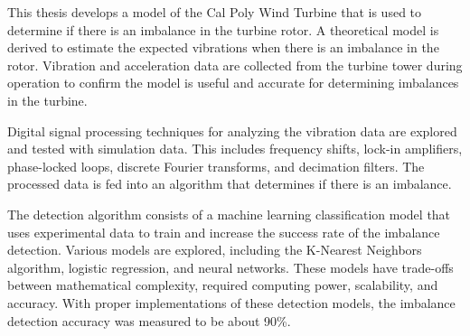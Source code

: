This thesis develops a model of the Cal Poly Wind Turbine that is used to determine if there is an imbalance in the turbine rotor.  A theoretical model is derived to estimate the expected vibrations when there is an imbalance in the rotor.  Vibration and acceleration data are collected from the turbine tower during operation to confirm the model is useful and accurate for determining imbalances in the turbine.  

Digital signal processing techniques for analyzing the vibration data are explored and tested with simulation data.  This includes frequency shifts, lock-in amplifiers, phase-locked loops, discrete Fourier transforms, and decimation filters.  The processed data is fed into an algorithm that determines if there is an imbalance.

The detection algorithm consists of a machine learning classification model that uses experimental data to train and increase the success rate of the imbalance detection.  Various models are explored, including the K-Nearest Neighbors algorithm, logistic regression, and neural networks.  These models have trade-offs between mathematical complexity, required computing power, scalability, and accuracy.  With proper implementations of these detection models, the imbalance detection accuracy was measured to be about 90\%.